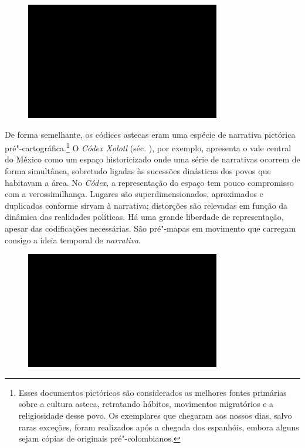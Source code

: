 \begin{figure}[!ht]

\centering
 \includegraphics[width=85mm]{./imgs/im1.jpg}
\caption{\tiny{}}

\end{figure}

De forma semelhante, os códices astecas eram uma espécie de narrativa
pictórica pré"-cartográfica.\footnote{Esses documentos pictóricos são
  considerados as melhores fontes primárias sobre a cultura asteca,
  retratando hábitos, movimentos migratórios e a religiosidade desse povo.
  Os exemplares que chegaram aos nossos dias, salvo raras exceções,
  foram realizados após a chegada dos espanhóis, embora alguns sejam
  cópias de originais pré"-colombianos.} O \emph{Códex Xolotl} (séc.
), por exemplo, apresenta o vale central do México como um espaço
historicizado onde uma série de narrativas ocorrem de forma simultânea,
sobretudo ligadas às sucessões dinásticas dos povos que habitavam a
área. No \emph{Códex,} a representação do espaço tem pouco compromisso
com a verossimilhança. Lugares são superdimensionados, aproximados e
duplicados conforme sirvam à narrativa; distorções são relevadas em
função da dinâmica das realidades políticas. Há uma grande liberdade de
representação, apesar das codificações necessárias. São pré"-mapas em
movimento que carregam consigo a ideia temporal de \emph{narrativa}.

\begin{figure}[!ht]

\centering
 \includegraphics[width=85mm]{./imgs/im1.jpg}
\caption{\tiny{}}

\end{figure}

